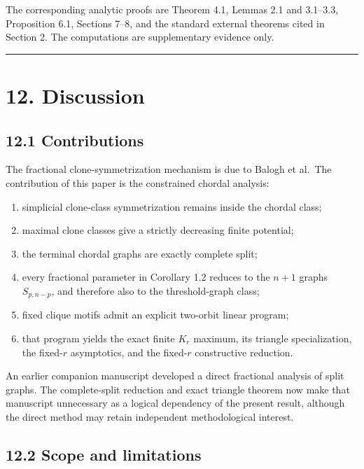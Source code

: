 \documentclass[11pt,a4paper]{article}
\providecommand{\tightlist}{\setlength{\itemsep}{0pt}\setlength{\parskip}{0pt}}
\begin{document}
The corresponding analytic proofs are Theorem 4.1, Lemmas 2.1 and
3.1--3.3, Proposition 6.1, Sections 7--8, and the standard external
theorems cited in Section 2. The computations are supplementary evidence
only.

\begin{center}\rule{0.5\linewidth}{0.5pt}\end{center}

\section{12. Discussion}\label{discussion}

\subsection{12.1 Contributions}\label{contributions}

The fractional clone-symmetrization mechanism is due to Balogh et al.~The
contribution of this paper is the constrained chordal analysis:

\begin{enumerate}
\def\labelenumi{\arabic{enumi}.}
\tightlist
\item
  simplicial clone-class symmetrization remains inside the chordal class;
\item
  maximal clone classes give a strictly decreasing finite potential;
\item
  the terminal chordal graphs are exactly complete split;
\item
  every fractional parameter in Corollary 1.2 reduces to the \(n+1\)
  graphs \(S_{p,n-p}\), and therefore also to the threshold-graph class;
\item
  fixed clique motifs admit an explicit two-orbit linear program;
\item
  that program yields the exact finite \(K_r\) maximum, its triangle
  specialization, the fixed-\(r\) asymptotics, and the fixed-\(r\)
  constructive reduction.
\end{enumerate}

An earlier companion manuscript developed a direct fractional analysis of
split graphs. The complete-split reduction and exact triangle theorem now
make that manuscript unnecessary as a logical dependency of the present
result, although the direct method may retain independent methodological
interest.

\subsection{12.2 Scope and limitations}\label{scope-and-limitations}
\end{document}
